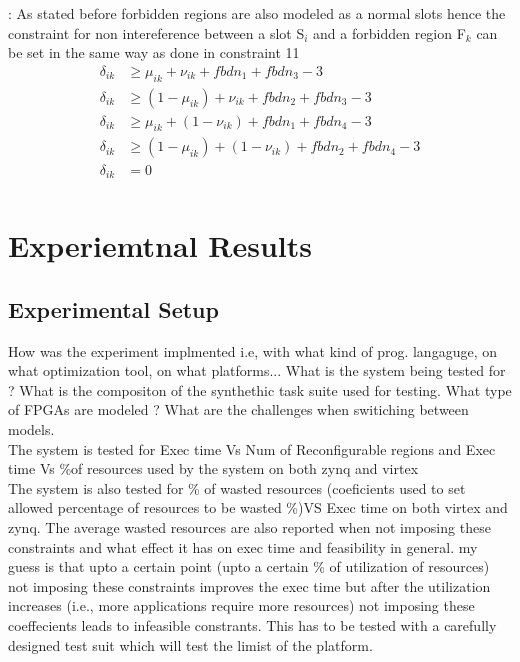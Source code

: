 \documentclass[conference]{IEEEtran}
\begin{document}
\begin{constraint}: As stated before forbidden regions are also modeled as a normal slots hence the constraint for non intereference between a slot S$_i$ and a forbidden region F$_k$ can be set in the same way as done in constraint 11
\begin{equation}
\begin{split}
\delta_{ik} & \geq \mu_{ik} + \nu_{ik} + fbdn_1 + fbdn_3 - 3 \\
\delta_{ik} & \geq (1 - \mu_{ik}) + \nu_{ik} + fbdn_2 + fbdn_3 - 3 \\
\delta_{ik} & \geq \mu_{ik} + (1 - \nu_{ik}) + fbdn_1 + fbdn_4 - 3 \\
\delta_{ik} & \geq (1 - \mu_{ik}) + (1 - \nu_{ik}) + fbdn_2 + fbdn_4 - 3 \\
\delta_{ik} & = 0 \\
\end{split}
\end{equation}
\end{constraint}


\section{Experiemtnal Results}
\subsection{Experimental Setup}
How was the experiment implmented i.e, with what kind of prog. langaguge, on what optimization tool, on what platforms...
What is the system being tested for ? What is the compositon of the synthethic task suite used for testing. What type of FPGAs are modeled ?  What are the challenges when switiching between models.  \\


The system is tested for Exec time Vs Num of Reconfigurable regions and Exec time Vs \%of resources used by the system on both zynq and virtex\\

The system is also tested for \% of wasted resources (coeficients used to set allowed percentage of resources to be wasted \%)VS Exec time on both virtex and zynq. The average wasted resources are also reported when not imposing these constraints and what effect it has on exec time and feasibility in general. my guess is that upto a certain point (upto a certain \% of utilization of resources) not imposing these constraints improves the exec time but after the utilization increases (i.e., more applications require more resources) not imposing these coeffecients leads to infeasible constrants. This has to be tested with a carefully designed test suit which will test the limist of the platform. \\
\end{document}

